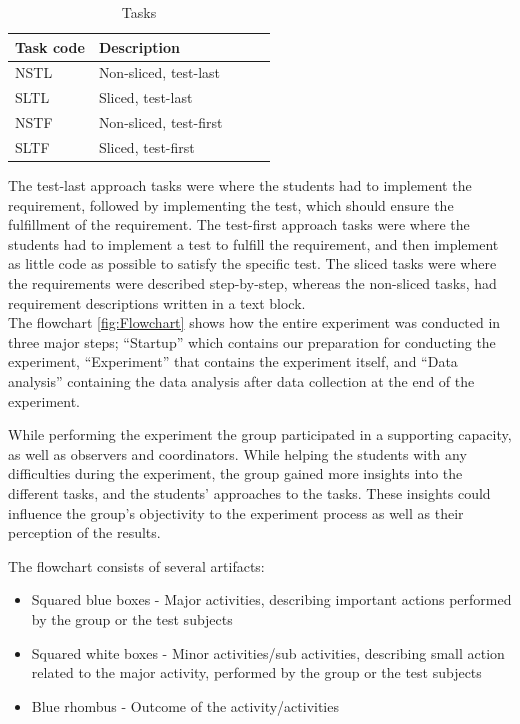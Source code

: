 \documentclass{sig-alternate-05-2015}
\begin{document}
\begin{table}[!ht]
\centering
\caption{Tasks}
\label{TaskTable}
\begin{tabular}{|l|p{0.68\linewidth}|}
\hline
\textbf{Task code} & \textbf{Description} \\
\hline
\hline
NSTL & Non-sliced, test-last \\
SLTL & Sliced, test-last \\
NSTF & Non-sliced, test-first \\
SLTF & Sliced, test-first\\
\hline
\end{tabular}
\end{table}

The test-last approach tasks were where the students had to implement the requirement, followed by implementing the test, which should ensure the fulfillment of the requirement.
The test-first approach tasks were where the students had to implement a test to fulfill the requirement, and then implement as little code as possible to satisfy the specific test.
The sliced tasks were where the requirements were described step-by-step, whereas the non-sliced tasks, had requirement descriptions written in a text block.\\



The flowchart \ref{fig:Flowchart} shows how the entire experiment was conducted in three major steps; ``Startup'' which contains our preparation for conducting the experiment, ``Experiment'' that contains the experiment itself, and ``Data analysis'' containing the data analysis after data collection at the end of the experiment.

While performing the experiment the group participated in a supporting capacity, as well as observers and coordinators. While helping the students with any difficulties during the experiment, the group gained more insights into the different tasks, and the students' approaches to the tasks. These insights could influence the group's objectivity to the experiment process as well as their perception of the results.

The flowchart consists of several artifacts:
\begin{itemize}
\item Squared blue boxes - Major activities, describing important actions performed by the group or the test subjects
\item Squared white boxes - Minor activities/sub activities, describing small action related to the major activity, performed by the group or the test subjects
\item Blue rhombus - Outcome of the activity/activities
\end{itemize}
\end{document}
